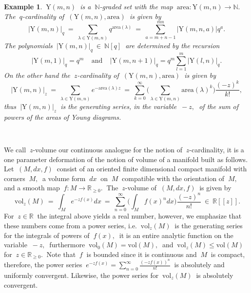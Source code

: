 \documentclass[10pt,leqeq]{article}
\newtheorem{exmp}[thm]{Example}
\begin{document}
\begin{exmp}
{\em  $\ \mathrm{Y}(m,n) \ $ is a  $\ \mathbb{N}$-graded set with the map
$\ \mathrm{area}: \mathrm{Y}(m,n) \rightarrow \mathbb{N}.\ $  The $\ q$-cardinality
of $\ (\mathrm{Y}(m,n),\mathrm{area}) \ $ is given by
$$|\mathrm{Y}(m,n)|_q  \ = \ \sum_{\lambda \in \mathrm{Y}(m,n)}q^{\mathrm{area}(\lambda)} \ = \ \sum_{a=m+n-1}^{mn}|\mathrm{Y}(m,n,a)| q^{a}.$$ The polynomials 
$\ |\mathrm{Y}(m,n)|_q \ \in \ \mathbb{N}[q]\ $ are determined by the recursion
$$|\mathrm{Y}(m,1)|_q=q^m \ \ \ \ \ \mbox{and} \ \ \ \ \ 
|\mathrm{Y}(m,n+1)|_q=q^m\sum_{l=1}^{m} |\mathrm{Y}(l,n)|_q.$$
On the other hand the $\ z$-cardinality of $\ (\mathrm{Y}(m,n),\mathrm{area})\ $ is given by
$$|\mathrm{Y}(m,n)|_z \ = \
\sum_{\lambda \in \mathrm{Y}(m,n)}e^{-\mathrm{area}(\lambda)z} \ = \
\sum_{k=0}^{\infty}\bigg(\sum_{\lambda \in \mathrm{Y}(m,n)} \mathrm{area}(\lambda)^k\bigg)\frac{(-z)^k}{k!} , $$
thus $\ |\mathrm{Y}(m,n)|_{z}\ $ is the generating series,
in the variable $ \ -z,\ $ of the sum of powers of the areas of Young diagrams.
}
\end{exmp}


\
  
We call $\ z$-volume our continuous analogue for the notion of $\ z$-cardinality, it is a one parameter deformation of the notion of volume of a manifold built as follows. Let $\ (M,dx,f) \ $ consist of an oriented finite dimensional compact manifold with corners $ \ M,\ $ a volume form $\ dx \ $ on $\ M \ $ compatible with the orientation of $\ M,\ $  and a smooth map $\ f: M \rightarrow \mathbb{R}_{\geq 0}. \ $ The $\ z$-volume 
of $\ (M,dx,f) \ $ is given by
$$ \ \mathrm{vol}_z(M) \ = \ \int_Me^{-zf(x)}dx \ = 
\ \sum_{n=0}^{\infty}\bigg( \int_Mf(x)^ndx \bigg)\frac{(-z)^n}{n!} \ \in
\ \mathbb{R}[[z]].$$
For  $\ z\in \mathbb{R} \ $ the integral above yields a real number, however, we emphasize that these numbers come from a power series, i.e. $ \ \mathrm{vol}_z(M) \ $ is the generating series
for the integrals of powers of $\ f(x),\ $  it is an entire analytic function on the variable $\ -z, \ $  furthermore $ \ \mathrm{vol}_0(M)=\mathrm{vol}(M), \ $
and $ \ \mathrm{vol}_z(M) \leq  \mathrm{vol}(M) \ $ for $\ z\in \mathbb{R}_{\geq 0}. \ $  Note that $\ f \ $ is bounded since it is continuous and $\ M \ $ is compact, therefore, the power series
$\ \displaystyle e^{-zf(x)}= \sum_{n=0}^{\infty} \frac{(-zf(x))^n}{n!} \ $ is absolutely and uniformly convergent. Likewise, the power series for $ \ \mathrm{vol}_z(M) \ $  is absolutely convergent. \\
 
\end{document}
